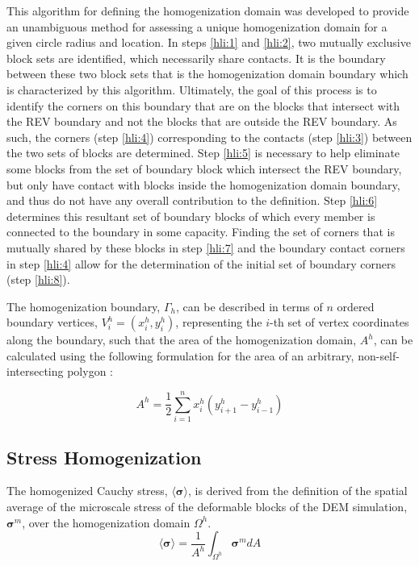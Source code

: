 This algorithm for defining the homogenization domain was developed to provide an unambiguous method for assessing a unique homogenization domain for a given circle radius and location. In steps \ref{hli:1} and \ref{hli:2}, two mutually exclusive block sets are identified, which necessarily share contacts. It is the boundary between these two block sets that is the homogenization domain boundary which is characterized by this algorithm. Ultimately, the goal of this process is to identify the corners on this boundary that are on the blocks that intersect with the REV boundary and not the blocks that are outside the REV boundary. As such, the corners (step \ref{hli:4}) corresponding to the contacts (step \ref{hli:3}) between the two sets of blocks are determined. Step \ref{hli:5} is necessary to help eliminate some blocks from the set of boundary block which intersect the REV boundary, but only have contact with blocks inside the homogenization domain boundary, and thus do not have any overall contribution to the definition. Step \ref{hli:6} determines this resultant set of boundary blocks of which every member is connected to the boundary in some capacity. Finding the set of corners that is mutually shared by these blocks in step \ref{hli:7} and the boundary contact corners in step \ref{hli:4} allow for the determination of the initial set of boundary corners (step \ref{hli:8}).

The homogenization boundary, $\Gamma_{h}$, can be described in terms of $n$ ordered boundary vertices, $V_{i}^{h}=(x_{i}^{h},y_{i}^{h})$, representing the $i$-th set of vertex coordinates along the boundary, such that the area of the homogenization domain, $A^{h}$, can be calculated using the following formulation for the area of an arbitrary, non-self-intersecting polygon \citep{Zwillinger_1995}: 

\begin{equation}
A^{h}=\dfrac{1}{2}\sum_{i=1}^{n}x_{i}^{h}(y_{i+1}^{h}-y_{i-1}^{h})
\label{eqn:hom1}
\end{equation}

\subsection{Stress Homogenization}

The homogenized Cauchy stress, $\langle\boldsymbol{\sigma}\rangle$, is derived from the definition of the spatial average of the microscale stress of the deformable blocks of the DEM simulation, $\boldsymbol{\sigma}^m$, over the homogenization domain $\Omega^{h}$. 
\begin{equation}
\langle\boldsymbol{\sigma}\rangle=\frac{1}{A^{h}}\int_{\Omega^{h}}\boldsymbol{\sigma}^m dA\label{eqn:stress1}
\end{equation}

